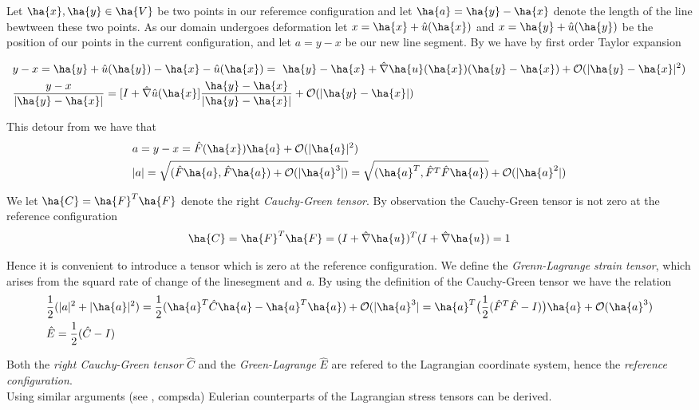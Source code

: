 Let $\ha{x}, \ha{y} \in \ha{V}$ be two points in our referemce configuration and let $\ha{a} = \ha{y} - \ha{x}$ denote the
length of the line bewtween these two points. As our domain undergoes deformation let 
$x = \ha{x} + \hat{u}( \ha{x} ) $ and $x = \ha{y} + \hat{u}( \ha{y} )  $ be the position of our points in the current configuration, and let $a = y - x$ be our new line segment. By \cite{Richter2016} we have by first order Taylor expansion

\begin{align*}
&y - x = \ha{y} + \hat{u}(\ha{y}) - \ha{x} - \hat{u}(\ha{x}) = \
\ha{y} - \ha{x} + \hat{\nabla}\ha{u}(\ha{x}) (\ha{y} - \ha{x}) 
+ \mathcal{O}(|\ha{y} - \ha{x} |^2) \\
&\frac{y - x}{|\ha{y} - \ha{x}|} = [I + \hat{\nabla}\hat{u}(\ha{x} ]  
\frac{\ha{y} - \ha{x}}{|\ha{y} - \ha{x}|} + \mathcal{O}(|\ha{y} - \ha{x} |) 
\end{align*}

This detour from \cite{Richter2016}  we have that 
\begin{align*}
&a = y - x = \hat{F}(\ha{x})\ha{a} +  \mathcal{O}(|\ha{a} |^2) \\
&|a| = \sqrt{ (\hat{F}\ha{a},\hat{F}\ha{a})+ \mathcal{O} (|\ha{a}^3|)  } = 
 \sqrt{ (\ha{a}^T, \hat{F}^T\hat{F}\ha{a})} + \mathcal{O} (|\ha{a}^2|)  
\end{align*}

We let $\ha{C} = \ha{F}^T \ha{F}$ denote the right \textit{Cauchy-Green tensor}.
By observation the Cauchy-Green tensor is not zero at the reference configuration 
\begin{align*}
\ha{C} =  \ha{F}^T \ha{F} = (I + \hat{\nabla} \ha{u})^T (I + \hat{\nabla} \ha{u}) = 1
\end{align*}

Hence it is convenient to introduce a tensor which is zero at the reference configuration. We define the \textit{Grenn-Lagrange strain tensor}, which arises from the squard rate of change of the linesegment  and \textit{a}. By using the definition of the Cauchy-Green tensor we have the relation
\begin{align*}
&\frac{1}{2}(|a|^2 + |\ha{a}|^2) = \frac{1}{2}(\ha{a}^T\hat{C}\ha{a}
 -\ha{a}^T \ha{a} ) + \mathcal{O}(|\ha{a}^3| = 
 \ha{a}^T \big(\frac{1}{2} (\hat{F}^T \hat{F} - I) \big) \ha{a} 
 + \mathcal{O}(\ha{a}^3) \\
&\hat{E} = \frac{1}{2}(\hat{C} - I)
\end{align*}

Both the \textit{right Cauchy-Green tensor} $\hat{C}$ and the \textit{Green-Lagrange} $\hat{E}$ are refered to the Lagrangian coordinate system, hence the \textit{reference configuration}. \\
Using similar arguments (see \cite{Richter2016}, compsda) Eulerian counterparts of the Lagrangian stress tensors can be derived.

